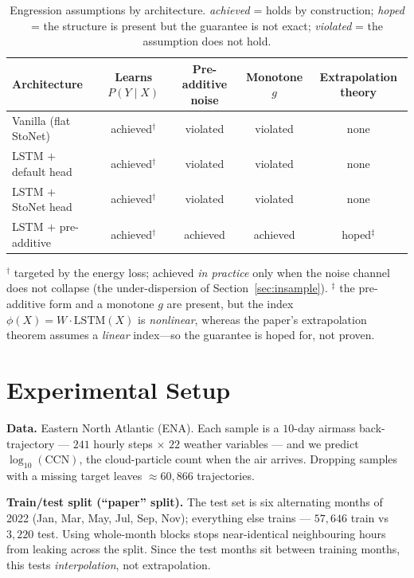 \documentclass[11pt]{article}
\begin{document}
\begin{table}[h]
  \centering
  \small
  \caption{Engression assumptions by architecture. \emph{achieved} = holds by
  construction; \emph{hoped} = the structure is present but the guarantee is not
  exact; \emph{violated} = the assumption does not hold.}
  \label{tab:assumptions}
  \begin{tabular}{lcccc}
    \toprule
    Architecture & Learns $P(Y\mid X)$ & Pre-additive noise & Monotone $g$ & Extrapolation theory \\
    \midrule
    Vanilla (flat StoNet) & achieved$^{\dagger}$ & violated & violated & none \\
    LSTM $+$ default head & achieved$^{\dagger}$ & violated & violated & none \\
    LSTM $+$ StoNet head & achieved$^{\dagger}$ & violated & violated & none \\
    LSTM $+$ pre-additive & achieved$^{\dagger}$ & achieved & achieved & hoped$^{\ddagger}$ \\
    \bottomrule
  \end{tabular}

  \smallskip
  {\footnotesize $^{\dagger}$ targeted by the energy loss; achieved \emph{in
  practice} only when the noise channel does not collapse (the under-dispersion of
  Section~\ref{sec:insample}).\quad
  $^{\ddagger}$ the pre-additive form and a monotone $g$ are present, but the index
  $\phi(X)=W\!\cdot\!\mathrm{LSTM}(X)$ is \emph{nonlinear}, whereas the paper's
  extrapolation theorem assumes a \emph{linear} index---so the guarantee is hoped
  for, not proven.}
\end{table}

\section{Experimental Setup}

\textbf{Data.} Eastern North Atlantic (ENA). Each sample is a $10$-day airmass
back-trajectory --- $241$ hourly steps $\times$ $22$ weather variables --- and we
predict $\log_{10}(\mathrm{CCN})$, the cloud-particle count when the air arrives.
Dropping samples with a missing target leaves $\approx 60{,}866$ trajectories.

\medskip
\noindent
\textbf{Train/test split (``paper'' split).} The test set is six alternating months of
2022 (Jan, Mar, May, Jul, Sep, Nov); everything else trains --- $57{,}646$ train vs
$3{,}220$ test. Using whole-month blocks stops near-identical neighbouring hours from
leaking across the split. Since the test months sit between training months, this tests
\emph{interpolation}, not extrapolation.
\end{document}
